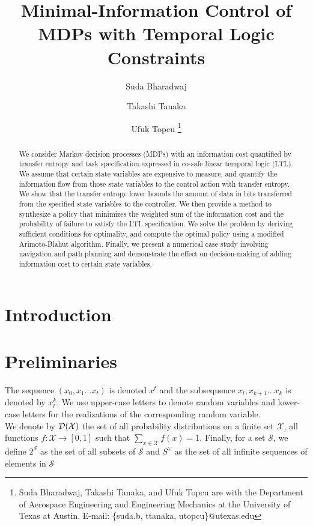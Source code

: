 \documentclass[letterpaper, 10 pt, conference]{ieeeconf}  %
\title{Minimal-Information Control of MDPs with Temporal Logic Constraints
}
\author{Suda Bharadwaj \and Takashi Tanaka \and Ufuk Topcu%
\thanks{Suda Bharadwaj, Takashi Tanaka, and Ufuk Topcu are with the Department of Aerospace Engineering and Engineering Mechanics at the University of Texas at Austin. E-mail: \{suda.b, ttanaka, utopcu\}@utexas.edu}%
}
\begin{document}
\maketitle
\thispagestyle{empty}
\pagestyle{empty}


\begin{abstract}
We consider Markov decision processes (MDPs) with an information cost quantified by transfer entropy and task specification expressed in co-safe linear temporal logic (LTL). We assume that certain state variables are expensive to measure, and quantify the information flow from those state variables to the control action with transfer entropy. We show that the transfer entropy lower bounds the amount of data in bits transferred from the specified state variables to the controller. We then provide a method to synthesize a policy that minimizes the weighted sum of the information cost and the probability of failure to satisfy the LTL specification. We solve the problem by deriving sufficient conditions for optimality, and compute the optimal policy using a modified Arimoto-Blahut algorithm. Finally, we present a numerical case study involving navigation and path planning and demonstrate the effect on decision-making of adding information cost to certain state variables.
\end{abstract}


\section{Introduction}


%


\section{Preliminaries}
The sequence $(x_0,x_{1}...x_t)$ is denoted $x^t$ and the subsequence $x_l,x_{k+1}...x_k$ is denoted by $x_{l}^{k}$. We use upper-case letters to denote random variables and lower-case letters for the realizations of the corresponding random variable. \\
We denote by $\mathcal{D}(\mathcal{X})$ the set of all probability distributions on a finite
set $\mathcal{X}$, \ie all functions $f: \mathcal{X} \to [0,1]$ such that $\sum_{x\in \mathcal{X}}f(x)=1$. Finally, for a set $\mathcal{S}$, we define $2^\mathcal{S}$ as the set of all subsets of $\mathcal{S}$ and $S^{\omega}$ as the set of all infinite sequences of elements in $\mathcal{S}$
 
\end{document}
